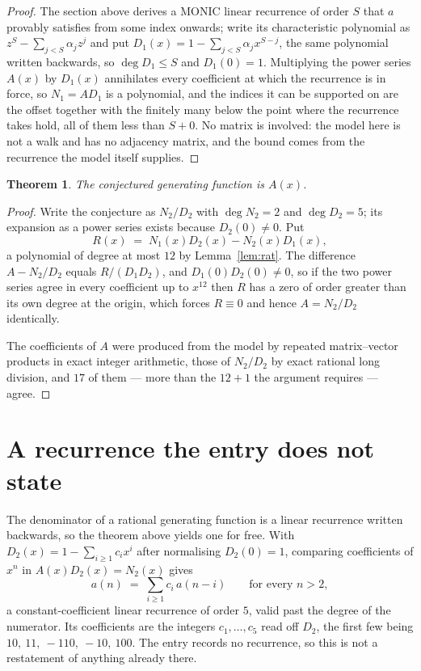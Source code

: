 \documentclass[11pt,a4paper]{article}
\theoremstyle{plain}
\newtheorem{theorem}{Theorem}
\theoremstyle{definition}
\begin{document}
\begin{proof}
The section above derives a MONIC linear recurrence of order $S$ that $a$ provably satisfies
from some index onwards; write its characteristic polynomial as $z^S-\sum_{j<S}\alpha_jz^j$
and put $D_1(x)=1-\sum_{j<S}\alpha_jx^{S-j}$, the same polynomial written backwards, so
$\deg D_1\le S$ and $D_1(0)=1$. Multiplying the power series $A(x)$ by $D_1(x)$ annihilates
every coefficient at which the recurrence is in force, so $N_1=AD_1$ is a polynomial, and the
indices it can be supported on are the offset together with the finitely many below the point
where the recurrence takes hold, all of them less than $S+0$. No matrix is involved: the
model here is not a walk and has no adjacency matrix, and the bound comes from the recurrence
the model itself supplies.
\end{proof}

\begin{theorem}
The conjectured generating function is $A(x)$.
\end{theorem}

\begin{proof}
Write the conjecture as $N_2/D_2$ with $\deg N_2=2$ and $\deg D_2=5$; its expansion as a
power series exists because $D_2(0)\neq0$. Put
\[
R(x)\;=\;N_1(x)D_2(x)-N_2(x)D_1(x),
\]
a polynomial of degree at most $12$ by Lemma~\ref{lem:rat}. The difference
$A-N_2/D_2$ equals $R/(D_1D_2)$, and $D_1(0)D_2(0)\neq0$, so if the two power series agree in
every coefficient up to $x^{12}$ then $R$ has a zero of order greater than its own
degree at the origin, which forces $R\equiv0$ and hence $A=N_2/D_2$ identically.

The coefficients of $A$ were produced from the model by repeated matrix--vector products in
exact integer arithmetic, those of $N_2/D_2$ by exact rational long division, and $17$
of them --- more than the $12+1$ the argument requires --- agree.
\end{proof}

\section{A recurrence the entry does not state}

The denominator of a rational generating function is a linear recurrence written backwards, so
the theorem above yields one for free. With $D_2(x)=1-\sum_{i\ge1}c_ix^i$ after normalising
$D_2(0)=1$, comparing coefficients of $x^n$ in $A(x)D_2(x)=N_2(x)$ gives
\[
a(n)\;=\;\sum_{i\ge1}c_i\,a(n-i)\qquad\text{for every }n>2,
\]
a constant-coefficient linear recurrence of order $5$, valid past the degree of the
numerator. Its coefficients are the integers $c_1,\dots,c_{5}$ read off $D_2$, the first few being $10,\ 11,\ -110,\ -10,\ 100$. The entry records no recurrence, so this is not a restatement of anything
already there.
\end{document}
